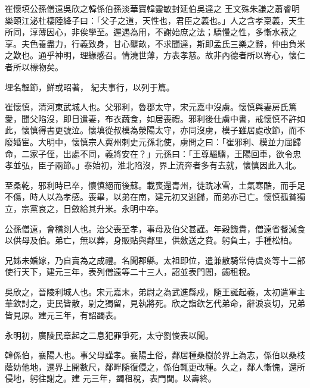 
\begin{pinyinscope}

 崔懷填公孫僧遠吳欣之韓係伯孫淡華寶韓靈敏封延伯吳達之
 王文殊朱謙之蕭睿明樂頤江泌杜棲陸絳子曰：「父子之道，天性也，君臣之義也。」人之含孝稟義，天生所同，淳薄因心，非俟學至。遲遇為用，不謝始庶之法；驕慢之性，多慚水菽之享。夫色養盡力，行義致身，甘心壟畝，不求聞達，斯即孟氏三樂之辭，仲由負米之歎也。通乎神明，理緣感召。情澆世薄，方表孝慈。故非內德者所以寄心，懷仁者所以標物矣。



 埋名韞節，鮮或昭著，
 紀夫事行，以列于篇。



 崔懷慎，清河東武城人也。父邪利，魯郡太守，宋元嘉中沒虜。懷慎與妻房氏篤愛，聞父陷沒，即日遣妻，布衣蔬食，如居喪禮。邪利後仕虜中書，戒懷慎不許如此，懷慎得書更號泣。懷填從叔模為滎陽太守，亦同沒虜，模子雖居處改節，而不廢婚宦。大明中，懷慎宗人冀州刺史元孫北使，虜問之曰：「崔邪利、模並力屈歸命，二家子侄，出處不同，義將安在？」元孫曰：「王尊驅驥，王陽回車，欲令忠孝並弘，臣子兩節。」泰始初，淮北陷沒，界上流奔者多有去就，懷慎因此入北。



 至桑乾，邪利時已卒，懷慎絕而後蘇。載喪還青州，徒跣冰雪，土氣寒酷，而手足不傷，時人以為孝感。喪畢，以弟在南，建元初又逃歸，而弟亦已亡。懷慎孤貧獨立，宗黨哀之，日斂給其升米。永明中卒。



 公孫僧遠，會稽剡人也。治父喪至孝，事母及伯父甚謹。年穀饑貴，僧遠省餐減食以供母及伯。弟亡，無以葬，身販貼與鄰里，供斂送之費。躬負土，手種松柏。



 兄姊未婚嫁，乃自賣為之成禮。名聞郡縣。太祖即位，遣兼散騎常侍虞炎等十二部使行天下，建元三年，表列僧遠等二十三人，詔並表門閭，蠲租稅。



 吳欣之，晉陵利城人也。宋元嘉末，弟尉之為武進縣戍，隨王誕起義，太初遣軍主華欽討之，吏民皆散，尉之獨留，見執將死。欣之詣欽乞代弟命，辭淚哀切，兄弟皆見原。建元三年，有詔蠲表。



 永明初，廣陵民章起之二息犯罪爭死，太守劉悛表以聞。



 韓係伯，襄陽人也。事父母謹孝。襄陽土俗，鄰居種桑樹於界上為志，係伯以桑枝蔭妨他地，遷界上開數尺，鄰畔隨復侵之，係伯輒更改種。久之，鄰人慚愧，還所侵地，躬往謝之。建
 元三年，蠲租稅，表門閭。以壽終。




\end{pinyinscope}
